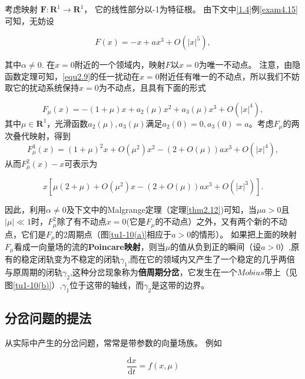 \begin{example}
  考虑映射
  $\boldsymbol { F } : \mathbf { R } ^ { 1 } \rightarrow \mathbf { R } ^ { 1 }$，
  它的线性部分以-1为特征根。
  由下文中\ref{1.4}例\ref{exam4.15}可知，无妨设
  
  \begin{equation}
    F ( x ) = - x + a x ^ { 3 } + O \left( | x | ^ { 5 } \right),
    \label{equ2.9} 
  \end{equation}
  
    其中\(\alpha \neq 0\).
    在\(x=0\)附近的一个领域内，映射\(F\)以\(x=0\)为唯一不动点。
    注意，由隐函数定理可知，\ref{equ2.9}的任一扰动在\(x=0\)附近任有唯一的不动点，所以我们不妨取它的扰动系统保持\(x=0\)为不动点，且具有下面的形式
    
    \[
      F _ { \mu } ( x ) = - ( 1 + \mu ) x + a _ { 2 } ( \mu ) x ^ { 2 } + a _ { 3 } ( \mu ) x ^ { 3 } + O \left( | x | ^ { 4 } \right),
    \]
    其中$\mu \in \mathbf { R }^1$，光滑函数$a _ { 2 } ( \mu ) , a _ { 3 } ( \mu )$满足$a _ { 2 } ( 0 ) = 0 , a _ { 3 } ( 0 ) = a$。考虑\(F_\mu\)的两次叠代映射，得到
    \[F _ { \mu } ^ { 3 } ( x ) = ( 1 + \mu ) ^ { 2 } x + O \left( \mu ^ { 2 } \right) x ^ { 2 } - ( 2 + O ( \mu ) ) a x ^ { 3 } + O \left( | x | ^ { 4 } \right),\]
    从而$F _ { \mu } ^ { 2 } ( x ) - x$可表示为
    
    \[
    x \left[ \mu ( 2 + \mu ) + O \left( \mu ^ { 2 } \right) x - ( 2 + O ( \mu ) ) a x ^ { 3 } + O \left( | x | ^ { 3 } \right) \right].
  \]
  
    因此，利用\(\alpha \neq 0\)及下文中的Malgrange定理（定理\ref{thm2.12})可知，当$\mu a > 0$且$| \mu | \ll 1$时，$F _ { \mu } ^ { 2 }$除了有不动点\(x=0\)(它是\(F_\mu\)的不动点）之外，又有两个新的不动点，它们是\(F_\mu\)的2周期点（图\ref{tu1-10(a)}相应于\(a>0\)的情形）。
    如果把上面的映射\(F_\mu\)看成一向量场的流的\textbf{Poincare映射}，则当\(\mu\)的值从负到正的瞬间（设\(a>0\)）,原有的稳定闭轨变为不稳定的闭轨\(\gamma_1\),而在它的领域内又产生了一个稳定的几乎两倍与原周期的闭轨\(\gamma_2\),这种分岔现象称为\textbf{倍周期分岔}，它发生在一个\(Mobius\)带上（见图\ref{tu1-10(b)}）,\(\gamma_1\)位于这带的轴线，而\(\gamma_2\)是这带的边界。
  \end{example}
  
  
 \subsection{分岔问题的提法}
  从实际中产生的分岔问题，常常是带参数的向量场族。
  例如
  
  \begin{equation}
    \frac { \mathrm { d } x } { \mathrm { d } t } = f ( x , \mu )
    \label{equ2.10} 
  \end{equation}
  
